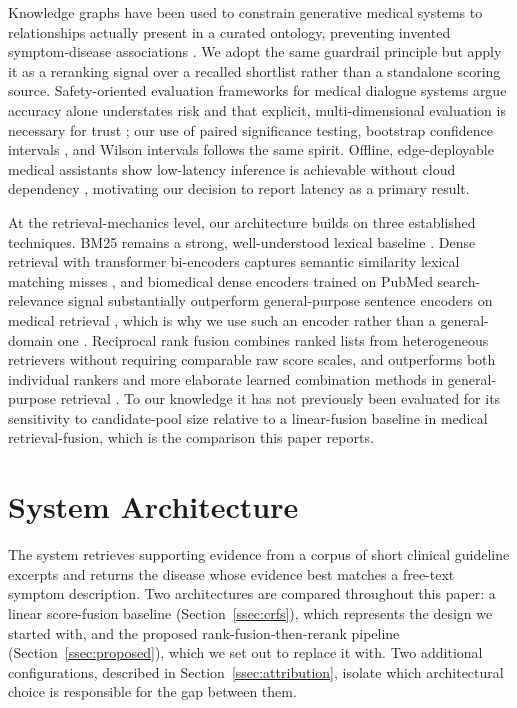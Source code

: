 \documentclass[10pt,conference]{IEEEtran}
\begin{document}
Knowledge graphs have been used to constrain generative medical systems to relationships actually present in a curated ontology, preventing invented symptom-disease associations \cite{nikam2024}. We adopt the same guardrail principle but apply it as a reranking signal over a recalled shortlist rather than a standalone scoring source. Safety-oriented evaluation frameworks for medical dialogue systems argue accuracy alone understates risk and that explicit, multi-dimensional evaluation is necessary for trust \cite{putra2025}; our use of paired significance testing, bootstrap confidence intervals \cite{efron1993bootstrap}, and Wilson intervals follows the same spirit. Offline, edge-deployable medical assistants show low-latency inference is achievable without cloud dependency \cite{ruhland2026}, motivating our decision to report latency as a primary result.

At the retrieval-mechanics level, our architecture builds on three established techniques. BM25 remains a strong, well-understood lexical baseline \cite{robertson2009bm25}. Dense retrieval with transformer bi-encoders captures semantic similarity lexical matching misses \cite{karpukhin2020dpr}, and biomedical dense encoders trained on PubMed search-relevance signal substantially outperform general-purpose sentence encoders on medical retrieval \cite{jin2023medcpt}, which is why we use such an encoder rather than a general-domain one \cite{devlin2019bert,reimers2019sbert}. Reciprocal rank fusion combines ranked lists from heterogeneous retrievers without requiring comparable raw score scales, and outperforms both individual rankers and more elaborate learned combination methods in general-purpose retrieval \cite{cormack2009rrf}. To our knowledge it has not previously been evaluated for its sensitivity to candidate-pool size relative to a linear-fusion baseline in medical retrieval-fusion, which is the comparison this paper reports.

\section{System Architecture}
\label{sec:architecture}

The system retrieves supporting evidence from a corpus of short clinical guideline excerpts and returns the disease whose evidence best matches a free-text symptom description. Two architectures are compared throughout this paper: a linear score-fusion baseline (Section~\ref{ssec:crfs}), which represents the design we started with, and the proposed rank-fusion-then-rerank pipeline (Section~\ref{ssec:proposed}), which we set out to replace it with. Two additional configurations, described in Section~\ref{ssec:attribution}, isolate which architectural choice is responsible for the gap between them.
\end{document}
